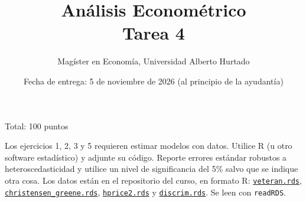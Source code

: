 \documentclass[letterpaper,11pt]{article}
\theoremstyle{plain}
\theoremstyle{definition}
\theoremstyle{remark}
\begin{document}
	\title {An\'alisis Econom\'etrico  \\ Tarea 4}
	\author{Mag\'ister en Econom\'ia, Universidad Alberto Hurtado}
	\date{Fecha de entrega: 5 de noviembre de 2026 (al principio de la ayudant\'ia)}

\maketitle

Total: 100 puntos

Los ejercicios 1, 2, 3 y 5 requieren estimar modelos con datos. Utilice R (u otro software
estad\'istico) y adjunte su c\'odigo. Reporte errores est\'andar robustos a
heteroscedasticidad y utilice un nivel de significancia del 5\% salvo que se indique otra
cosa. Los datos est\'an en el repositorio del curso, en formato R:
\href{https://github.com/ramirode/econometria_mae/raw/main/problem-sets/datos/veteran.rds}{\texttt{veteran.rds}},
\href{https://github.com/ramirode/econometria_mae/raw/main/problem-sets/datos/christensen_greene.rds}{\texttt{christensen\_greene.rds}},
\href{https://github.com/ramirode/econometria_mae/raw/main/problem-sets/datos/hprice2.rds}{\texttt{hprice2.rds}} y
\href{https://github.com/ramirode/econometria_mae/raw/main/problem-sets/datos/discrim.rds}{\texttt{discrim.rds}}. Se leen con \texttt{readRDS}.
\end{document}
